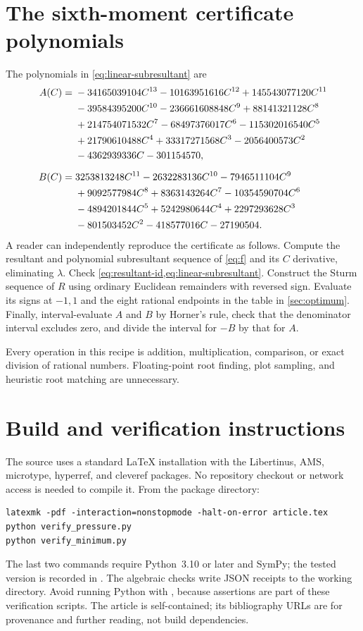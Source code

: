 \documentclass[11pt,a4paper]{article}
\numberwithin{equation}{section}
\theoremstyle{definition}
\theoremstyle{remark}
\newcommand{\code}[1]{\texttt{\detokenize{#1}}}
\begin{document}
\section{The sixth-moment certificate polynomials}
\label{sec:certificate-polynomials}
The polynomials in \cref{eq:linear-subresultant} are
\begin{align}
 A(C)={}&-34165039104C^{13}-10163951616C^{12}
 +145543077120C^{11}\notag\\
 &-39584395200C^{10}-236661608848C^9
 +88141321128C^8\notag\\
 &+214754071532C^7-68497376017C^6
 -115302016540C^5\notag\\
 &+21790610488C^4+33317271568C^3
 -2056400573C^2\notag\\
 &-4362939336C-301154570,
 \label{eq:A-certificate}\\[2mm]
 B(C)={}&3253813248C^{11}-2632283136C^{10}
 -7946511104C^9\notag\\
 &+9092577984C^8+8363143264C^7
 -10354590704C^6\notag\\
 &-4894201844C^5+5242980644C^4
 +2297293628C^3\notag\\
 &-801503452C^2-418577016C-27190504.
 \label{eq:B-certificate}
\end{align}
A reader can independently reproduce the certificate as follows.
Compute the resultant and polynomial subresultant sequence of
\cref{eq:f} and its $C$ derivative, eliminating $\lambda$.
Check \cref{eq:resultant-id,eq:linear-subresultant}. Construct the Sturm
sequence of $R$ using ordinary Euclidean remainders with reversed sign.
Evaluate its signs at $-1,1$ and the eight rational endpoints in the
table in \cref{sec:optimum}. Finally, interval-evaluate $A$ and $B$ by
Horner's rule, check that the denominator interval excludes zero, and
divide the interval for $-B$ by that for $A$.

Every operation in this recipe is addition, multiplication, comparison,
or exact division of rational numbers. Floating-point root finding,
plot sampling, and heuristic root matching are unnecessary.

\section{Build and verification instructions}
The source uses a standard \LaTeX{} installation with the Libertinus,
AMS, microtype, hyperref, and cleveref packages. No repository checkout
or network access is needed to compile it. From the package directory:
\begin{verbatim}
latexmk -pdf -interaction=nonstopmode -halt-on-error article.tex
python verify_pressure.py
python verify_minimum.py
\end{verbatim}
The last two commands require Python~3.10 or later and SymPy; the tested
version is recorded in \code{requirements.txt}. The algebraic checks
write JSON receipts to the working directory. Avoid running Python with
\code{-O}, because assertions are part of these verification scripts.
The article is self-contained; its bibliography URLs are for provenance
and further reading, not build dependencies.
\end{document}
